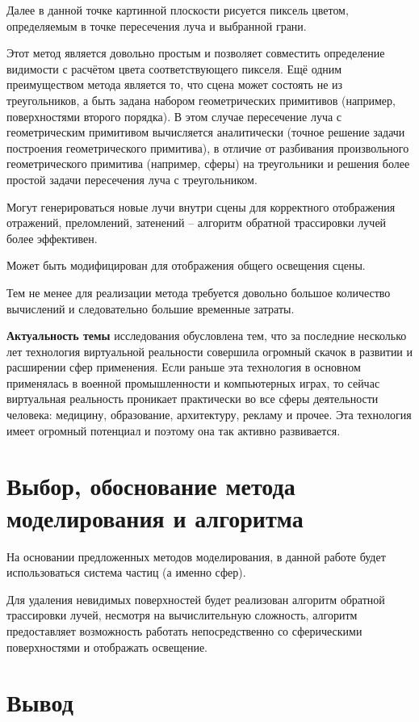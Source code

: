  Далее в данной точке картинной плоскости рисуется пиксель цветом, определяемым в точке пересечения луча и выбранной грани. 
 
 Этот метод является довольно простым и позволяет совместить определение видимости с расчётом цвета соответствующего пикселя. Ещё одним преимуществом метода является то, что сцена может состоять не из треугольников, а быть задана набором геометрических примитивов (например, поверхностями второго порядка). В этом случае пересечение луча с геометрическим примитивом вычисляется аналитически (точное решение задачи построения геометрического примитива), в отличие от разбивания произвольного геометрического примитива (например, сферы) на треугольники и решения более простой задачи пересечения луча с треугольником. 
 
 Могут генерироваться новые лучи внутри сцены для корректного отображения отражений, преломлений, затенений -- алгоритм обратной трассировки лучей более эффективен.
 
Может быть модифицирован для отображения общего освещения сцены. 

Тем не менее для реализации метода требуется довольно большое количество вычислений и следовательно большие временные затраты. 


\textbf{Актуальность темы} исследования обусловлена тем, что за последние несколько лет технология виртуальной реальности совершила огромный скачок в развитии и расширении сфер применения. Если раньше эта технология в основном применялась в военной промышленности и компьютерных играх, то сейчас виртуальная реальность проникает практически во все сферы деятельности человека: медицину, образование, архитектуру, рекламу и прочее. Эта технология имеет огромный потенциал и поэтому она так активно развивается.

\section{\textbf{Выбор, обоснование метода моделирования и алгоритма}}

На основании предложенных методов моделирования, в данной работе будет использоваться система частиц (а именно сфер). 

Для удаления невидимых поверхностей будет реализован алгоритм обратной трассировки лучей, несмотря на вычислительную сложность, алгоритм предоставляет возможность работать непосредственно со сферическими поверхностями и отображать освещение. 

\section{\textbf{Вывод}}

